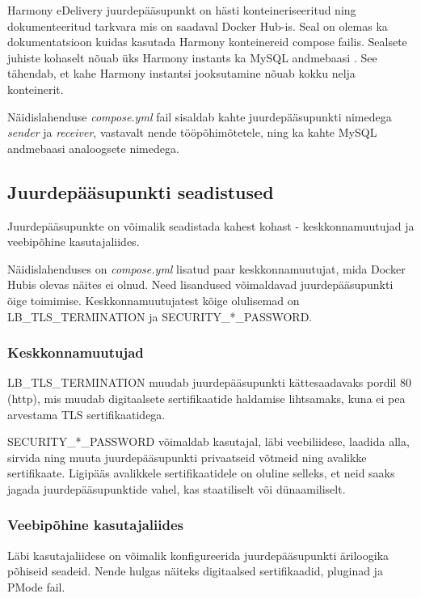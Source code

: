 Harmony eDelivery juurdepääsupunkt on hästi konteineriseeritud ning dokumenteeritud tarkvara
mis on saadaval Docker Hub-is. Seal on olemas ka dokumentatsioon kuidas kasutada Harmony konteinereid
compose failis. Sealsete juhiste kohaselt nõuab üks Harmony instants ka MySQL andmebaasi \cite{niis_harmony_ap_docker}. 
See tähendab, et kahe Harmony instantsi jooksutamine nõuab kokku nelja konteinerit.

Näidislahenduse \textit{compose.yml} fail sisaldab kahte juurdepääsupunkti
nimedega \textit{sender} ja \textit{receiver}, vastavalt nende tööpõhimõtetele, 
ning ka kahte MySQL andmebaasi analoogsete nimedega.



\subsection{Juurdepääsupunkti seadistused}
Juurdepääsupunkte on võimalik seadistada kahest kohast - keskkonnamuutujad ja veebipõhine kasutajaliides.

Näidislahenduses on \textit{compose.yml} lisatud paar keskkonnamuutujat, mida Docker Hubis 
olevas näites ei olnud. Need lisandused võimaldavad juurdepääsupunkti õige toimimise.
Keskkonnamuutujatest kõige olulisemad on LB\_TLS\_TERMINATION ja SECURITY\_*\_PASSWORD.

\subsubsection{Keskkonnamuutujad}

LB\_TLS\_TERMINATION muudab juurdepääsupunkti kättesaadavaks pordil 80 (http), mis muudab
digitaalsete sertifikaatide haldamise lihtsamaks, kuna ei pea arvestama TLS sertifikaatidega.

SECURITY\_*\_PASSWORD võimaldab kasutajal, läbi veebiliidese, laadida alla, 
sirvida ning muuta juurdepääsupunkti privaatseid võtmeid ning avalikke sertifikaate. 
Ligipääs avalikkele sertifikaatidele on oluline selleks, 
et neid saaks jagada juurdepääsupunktide vahel, kas staatiliselt või dünaamiliselt.

\subsubsection{Veebipõhine kasutajaliides}

Läbi kasutajaliidese on võimalik konfigureerida juurdepääsupunkti äriloogika põhiseid seadeid.
Nende hulgas näiteks digitaalsed sertifikaadid, pluginad ja PMode fail.

